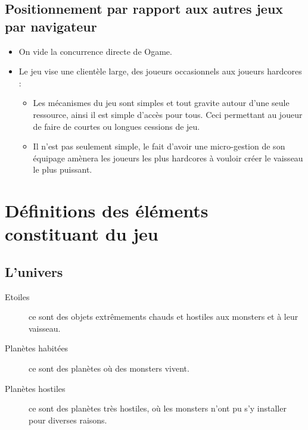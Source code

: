 \documentclass[a4paper,11pt]{report}
\begin{document}
    \section{Positionnement par rapport aux autres jeux par navigateur}
    \begin{itemize}
      \item On vide la concurrence directe de Ogame.
      \item Le jeu vise une clientèle large, des joueurs occasionnels aux joueurs hardcores :
      \begin{itemize}
        \item Les mécanismes du jeu sont simples et tout gravite autour d'une seule ressource, ainsi il est simple d'accès pour tous. Ceci permettant au joueur de faire de courtes ou longues cessions de jeu.
        \item Il n'est pas seulement simple, le fait d'avoir une micro-gestion de son équipage amènera les joueurs les plus hardcores à vouloir créer le vaisseau le plus puissant.
      \end{itemize}
    \end{itemize}

\chapter{Définitions des éléments constituant du jeu}
    \section{L'univers}
      \begin{description}
        \item[Etoiles] ce sont des objets extrêmements chauds et hostiles aux monsters et à leur vaisseau.
        \item[Planètes habitées] ce sont des planètes où des monsters vivent.
        \item[Planètes hostiles] ce sont des planètes très hostiles, où les monsters n'ont pu s'y installer pour diverses raisons.
      \end{description}
      
\end{document}
